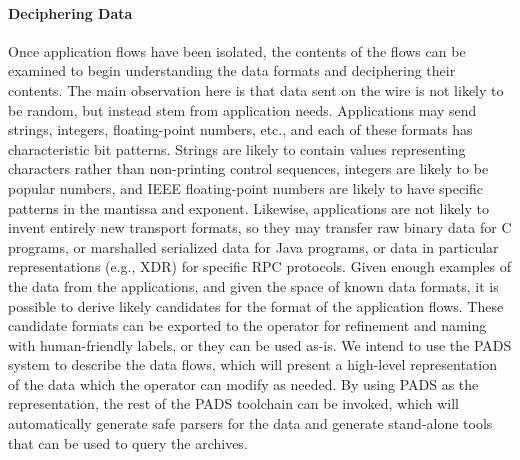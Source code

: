 \paragraph*{Deciphering Data} Once application flows have been isolated, the
contents of the flows can be examined to begin understanding the data
formats and deciphering their contents. The main observation here is that
data sent on the wire is not likely to be random, but instead stem
from application needs. Applications may send strings, integers,
floating-point numbers, etc., and each of these formats has
characteristic bit patterns. Strings are likely to contain
values representing characters rather than non-printing control
sequences, integers are likely to be popular numbers,
and IEEE floating-point numbers are likely to have specific patterns
in the mantissa and exponent.  Likewise, applications are not likely
to invent entirely new transport formats, so they may transfer raw
binary data for C programs, or marshalled serialized data for Java
programs, or data in particular representations (e.g., XDR) for
specific RPC protocols. Given enough examples of the data from the
applications, and given the space of known data formats, it is
possible to derive likely candidates for the format of the application
flows. These candidate formats can be exported to the operator for
refinement and naming with human-friendly labels, or they can be used
as-is. We intend to use the PADS system to describe the data flows,
which will present a high-level representation of the data which the
operator can modify as needed. By using PADS as the representation,
the rest of the PADS toolchain can be invoked, which will
automatically generate safe parsers for the data and generate
stand-alone tools that can be used to query the archives.

